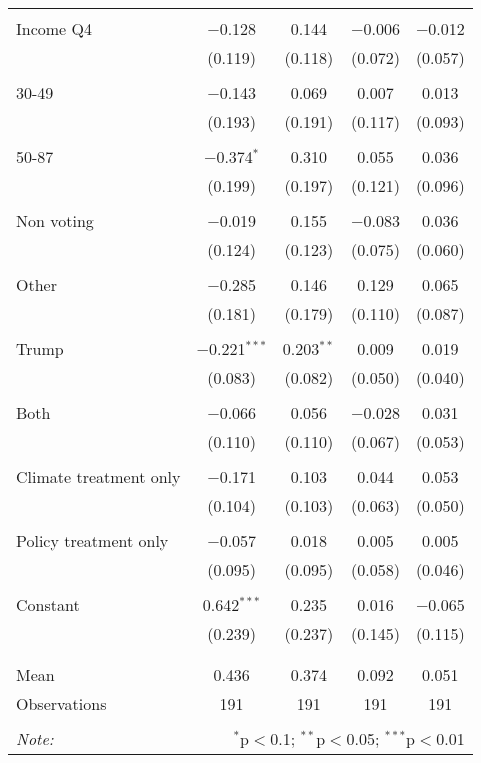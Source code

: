 \begin{tabular}{@{\extracolsep{5pt}}lcccc}
  & & & & \\ 
 Income Q4 & $-$0.128 & 0.144 & $-$0.006 & $-$0.012 \\ 
  & (0.119) & (0.118) & (0.072) & (0.057) \\ 
  & & & & \\ 
 30-49 & $-$0.143 & 0.069 & 0.007 & 0.013 \\ 
  & (0.193) & (0.191) & (0.117) & (0.093) \\ 
  & & & & \\ 
 50-87 & $-$0.374$^{*}$ & 0.310 & 0.055 & 0.036 \\ 
  & (0.199) & (0.197) & (0.121) & (0.096) \\ 
  & & & & \\ 
 Non voting & $-$0.019 & 0.155 & $-$0.083 & 0.036 \\ 
  & (0.124) & (0.123) & (0.075) & (0.060) \\ 
  & & & & \\ 
 Other & $-$0.285 & 0.146 & 0.129 & 0.065 \\ 
  & (0.181) & (0.179) & (0.110) & (0.087) \\ 
  & & & & \\ 
 Trump & $-$0.221$^{***}$ & 0.203$^{**}$ & 0.009 & 0.019 \\ 
  & (0.083) & (0.082) & (0.050) & (0.040) \\ 
  & & & & \\ 
 Both & $-$0.066 & 0.056 & $-$0.028 & 0.031 \\ 
  & (0.110) & (0.110) & (0.067) & (0.053) \\ 
  & & & & \\ 
 Climate treatment only & $-$0.171 & 0.103 & 0.044 & 0.053 \\ 
  & (0.104) & (0.103) & (0.063) & (0.050) \\ 
  & & & & \\ 
 Policy treatment only & $-$0.057 & 0.018 & 0.005 & 0.005 \\ 
  & (0.095) & (0.095) & (0.058) & (0.046) \\ 
  & & & & \\ 
 Constant & 0.642$^{***}$ & 0.235 & 0.016 & $-$0.065 \\ 
  & (0.239) & (0.237) & (0.145) & (0.115) \\ 
  & & & & \\ 
\hline \\[-1.8ex] 
Mean & 0.436 & 0.374 & 0.092 & 0.051 \\ 
Observations & 191 & 191 & 191 & 191 \\ 
\hline 
\hline \\[-1.8ex] 
\textit{Note:}  & \multicolumn{4}{r}{$^{*}$p$<$0.1; $^{**}$p$<$0.05; $^{***}$p$<$0.01} \\ 
\end{tabular} 
